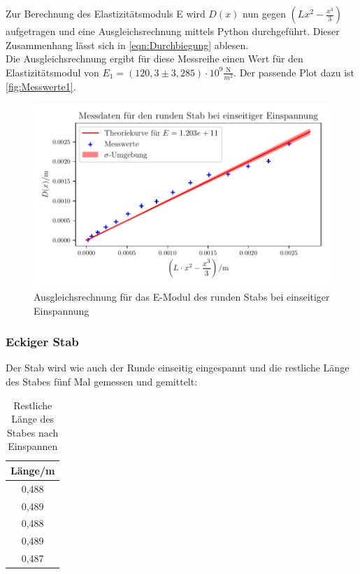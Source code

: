   Zur Berechnung des Elastizitätsmoduls E wird $D(x)$ nun gegen $\left(Lx^2-\frac{x^3}{3}\right)$ aufgetragen und eine Ausgleichsrechnung mittels Python durchgeführt. Dieser
  Zusammenhang lässt sich in \autoref{eqn:Durchbiegung} ablesen.\\
  Die Ausgleichsrechnung ergibt für diese Messreihe einen Wert für den Elastizitätsmodul von $E_1 = (120{,}3 \pm 3{,}285) \cdot \mathrm{10^{9}} \frac{\mathrm{N}}{m^2}$. Der passende Plot dazu ist
  \autoref{fig:Messwerte1}.

  \begin{figure}
    \centering
    \includegraphics{build/plot2.pdf}
    \caption{Ausgleichsrechnung für das E-Modul des runden Stabs bei einseitiger Einspannung}
    \label{fig:Messwerte1}
  \end{figure}

  \newpage

\subsubsection{Eckiger Stab}
  Der Stab wird wie auch der Runde einseitig eingespannt und die restliche Länge des Stabes fünf Mal gemessen und gemittelt:

  \begin{table}
    \centering
    \caption{Restliche Länge des Stabes nach Einspannen}
    \label{tab:einseitig_eckiger_Laenge}
    \begin{tabular}{c}
      \toprule
      Länge/m \\
      \midrule
      0,488 \\
      0,489 \\
      0,488 \\
      0,489 \\
      0,487 \\
      \bottomrule
    \end{tabular}
  \end{table}

